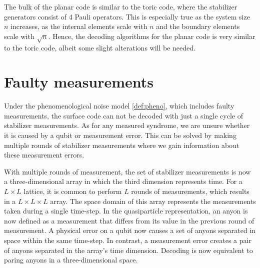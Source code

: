 \vspace{1em}
The bulk of the planar code is similar to the toric code, where the stabilizer generators consist of 4 Pauli operators. This is especially true as the system size $n$ increases, as the internal elements scale with $n$ and the boundary elements scale with $\sqrt{n}$. Hence, the decoding algorithms for the planar code is very similar to the toric code, albeit some slight alterations will be needed. 

\section{Faulty measurements}\label{sec:faultymeasurments}

Under the phenomenological noise model \ref{def:pheno}, which includes faulty measurements, the surface code can not be decoded with just a single cycle of stabilizer measurements. As for any measured syndrome, we are unsure whether it is caused by a qubit or measurement error. This can be solved by making multiple rounds of stabilizer measurements where we gain information about these measurement errors. 

With multiple rounds of measurement, the set of stabilizer measurements is now a three-dimensional array in which the third dimension represents time. For a $L\times L$ lattice, it is common to perform $L$ rounds of measurements, which results in a $L \times L \times L$ array. The space domain of this array represents the measurements taken during a single time-step. In the quasiparticle representation, an anyon is now defined as a measurement that differs from its value in the previous round of measurement. A physical error on a qubit now causes a set of anyons separated in space within the same time-step. In contrast, a measurement error creates a pair of anyons separated in the array's time dimension. Decoding is now equivalent to paring anyons in a three-dimensional space. 


